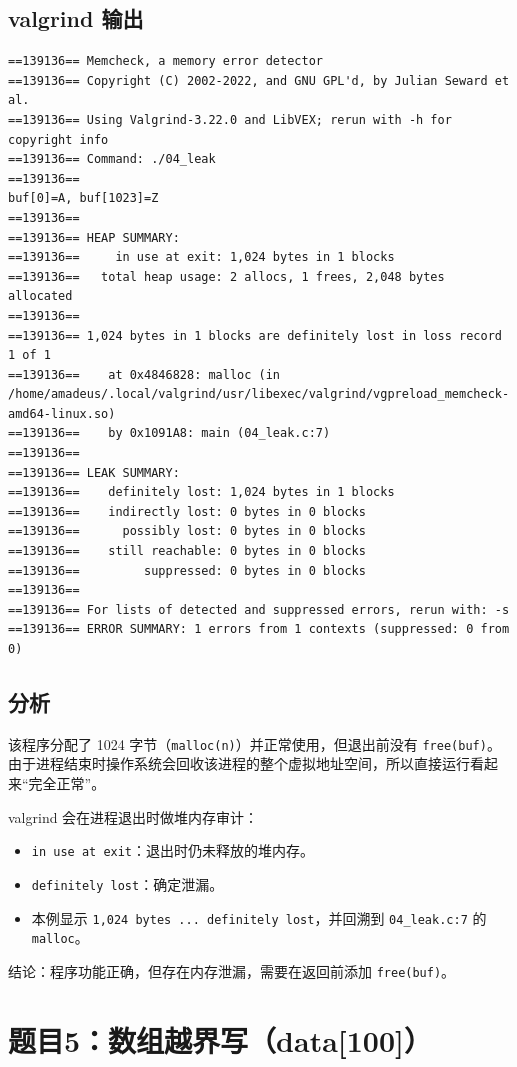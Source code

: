 \documentclass[fleqn]{ctexart}
\begin{document}
\subsection*{valgrind 输出}
\begin{verbatim}
==139136== Memcheck, a memory error detector
==139136== Copyright (C) 2002-2022, and GNU GPL'd, by Julian Seward et al.
==139136== Using Valgrind-3.22.0 and LibVEX; rerun with -h for copyright info
==139136== Command: ./04_leak
==139136== 
buf[0]=A, buf[1023]=Z
==139136== 
==139136== HEAP SUMMARY:
==139136==     in use at exit: 1,024 bytes in 1 blocks
==139136==   total heap usage: 2 allocs, 1 frees, 2,048 bytes allocated
==139136== 
==139136== 1,024 bytes in 1 blocks are definitely lost in loss record 1 of 1
==139136==    at 0x4846828: malloc (in /home/amadeus/.local/valgrind/usr/libexec/valgrind/vgpreload_memcheck-amd64-linux.so)
==139136==    by 0x1091A8: main (04_leak.c:7)
==139136== 
==139136== LEAK SUMMARY:
==139136==    definitely lost: 1,024 bytes in 1 blocks
==139136==    indirectly lost: 0 bytes in 0 blocks
==139136==      possibly lost: 0 bytes in 0 blocks
==139136==    still reachable: 0 bytes in 0 blocks
==139136==         suppressed: 0 bytes in 0 blocks
==139136== 
==139136== For lists of detected and suppressed errors, rerun with: -s
==139136== ERROR SUMMARY: 1 errors from 1 contexts (suppressed: 0 from 0)
\end{verbatim}

\subsection*{分析}
该程序分配了 1024 字节（\verb|malloc(n)|）并正常使用，但退出前没有 \verb|free(buf)|。
由于进程结束时操作系统会回收该进程的整个虚拟地址空间，所以直接运行看起来“完全正常”。

valgrind 会在进程退出时做堆内存审计：
\begin{itemize}[leftmargin=2em]
\item \verb|in use at exit|：退出时仍未释放的堆内存。
\item \verb|definitely lost|：确定泄漏。
\item 本例显示 \verb|1,024 bytes ... definitely lost|，并回溯到 \verb|04_leak.c:7| 的 \verb|malloc|。
\end{itemize}

结论：程序功能正确，但存在内存泄漏，需要在返回前添加 \verb|free(buf)|。


\section*{题目5：数组越界写（data[100]）}
\end{document}
